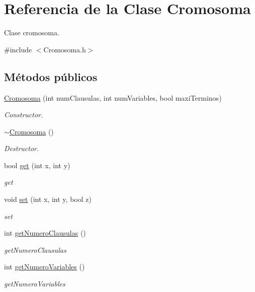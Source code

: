 \hypertarget{classCromosoma}{\section{Referencia de la Clase Cromosoma}
\label{classCromosoma}
}


Clase cromosoma.  




{\ttfamily \#include $<$Cromosoma.\-h$>$}

\subsection*{Métodos públicos}
\begin{DoxyCompactItemize}
\item 
\hyperlink{classCromosoma_a8fca0c1bd72c65aac6c2f26494e2c5f9}{Cromosoma} (int num\-Clausulas, int num\-Variables, bool maxi\-Terminos)
\begin{DoxyCompactList}\small\item\em Constructor. \end{DoxyCompactList}\item 
\hyperlink{classCromosoma_a39310d043c187768ba83a1a9c921e966}{$\sim$\-Cromosoma} ()
\begin{DoxyCompactList}\small\item\em Destructor. \end{DoxyCompactList}\item 
bool \hyperlink{classCromosoma_a59d6a42685e8b6e983b496d8051e4168}{get} (int x, int y)
\begin{DoxyCompactList}\small\item\em get \end{DoxyCompactList}\item 
void \hyperlink{classCromosoma_aaf002d2f7f9438e74eeba52892868e83}{set} (int x, int y, bool z)
\begin{DoxyCompactList}\small\item\em set \end{DoxyCompactList}\item 
int \hyperlink{classCromosoma_a53e4a3cda8f7a0b2233f0219579f7cc3}{get\-Numero\-Clausulas} ()
\begin{DoxyCompactList}\small\item\em get\-Numero\-Clausulas \end{DoxyCompactList}\item 
int \hyperlink{classCromosoma_a825104a1dd2a7595d119907c84fd2fd1}{get\-Numero\-Variables} ()
\begin{DoxyCompactList}\small\item\em get\-Numero\-Variables \end{DoxyCompactList}\item 

\end{DoxyCompactItemize}
